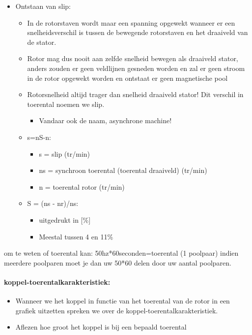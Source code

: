 \documentclass[12pt]{article}
\begin{document}
\begin{itemize}
    \item Ontstaan van slip:\begin{itemize}
        \item In de rotorstaven wordt maar een spanning opgewekt wanneer er een snelheidsverschil is tussen de bewegende rotorstaven en het draaiveld van de stator. 
        \item Rotor mag dus nooit aan zelfde snelheid bewegen als draaiveld stator, anders zouden er geen veldlijnen gesneden worden en zal er geen stroom in de rotor opgewekt worden en ontstaat er geen magnetische pool
        \item Rotorsnelheid altijd trager dan snelheid draaiveld stator! Dit verschil in toerental noemen we slip.\begin{itemize}
            \item Vandaar ook de naam, asynchrone machine!
        \end{itemize}
        \item s=nS-n:\begin{itemize}
            \item s = slip (tr/min)
            \item ns = synchroon toerental (toerental draaiveld) (tr/min)
            \item n = toerental rotor (tr/min)
        \end{itemize}
        \item S = (ns - nr)/ns:\begin{itemize}
            \item uitgedrukt in [\%]
            \item Meestal tussen 4 en 11\%
        \end{itemize}
    \end{itemize}
\end{itemize}
om te weten of toerental kan: 50hz*60seconden=toerental (1 poolpaar)
indien meerdere poolparen moet je dan uw 50*60 delen door uw aantal poolparen.
\paragraph{koppel-toerentalkarakteristiek:}
\begin{itemize}
    \item Wanneer we het koppel in functie van het toerental van de rotor in een grafiek
    uitzetten spreken we over de koppel-toerentalkarakteristiek.
    \item Aflezen hoe groot het koppel is bij een bepaald toerental
\end{itemize}
\end{document}

